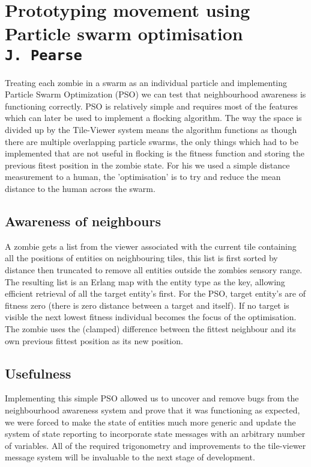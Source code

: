 \pagestyle{empty}

\section{Prototyping movement using Particle swarm optimisation\\{\small\tt{J.~Pearse}}}
Treating each zombie in a swarm as an individual particle and implementing Particle Swarm Optimization (PSO) we can test that neighbourhood awareness is functioning correctly. PSO is relatively simple and requires most of the features which can later be used to implement a flocking algorithm. The way the space is divided up by the Tile-Viewer system means the algorithm functions as though there are multiple overlapping particle swarms, the only things which had to be implemented that are not useful in flocking is the fitness function and storing the previous fitest position in the zombie state. For his we used a simple distance measurement to a human, the 'optimisation' is to try and reduce the mean distance to the human across the swarm. 

\subsection{Awareness of neighbours}
A zombie gets a list from the viewer associated with the current tile containing all the positions of entities on neighbouring tiles, this list is first sorted by distance  then truncated to remove all entities outside the zombies sensory range. The resulting list is an Erlang map with the entity type as the key, allowing efficient retrieval of all the target entity’s first. For the PSO, target entity's are of fitness zero (there is zero distance between a target and itself). If no target is visible the next lowest fitness individual becomes the focus of the optimisation. The zombie uses the (clamped) difference between the fittest neighbour and its own previous fittest position as its new position.

\subsection{Usefulness}
Implementing this simple PSO allowed us to uncover and remove bugs from the neighbourhood awareness system and prove that it was functioning as expected, we were forced to make the state of entities much more generic and update the system of state reporting to incorporate state messages with an arbitrary number of variables. All of the required trigonometry and improvements to the tile-viewer message system will be invaluable to the next stage of development. 

